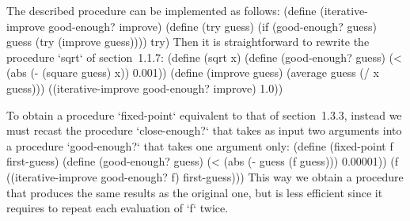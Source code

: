 The described procedure can be implemented as follows:
\begtt\scm
(define (iterative-improve good-enough? improve)
  (define (try guess)
    (if (good-enough? guess)
      guess
      (try (improve guess))))
  try)
\endtt
Then it is straightforward to rewrite the procedure `sqrt` of section~1.1.7:
\begtt\scm
(define (sqrt x)
  (define (good-enough? guess)
    (< (abs (- (square guess) x)) 0.001))
  (define (improve guess)
    (average guess (/ x guess)))
  ((iterative-improve good-enough? improve) 1.0))
\endtt

To obtain a procedure `fixed-point` equivalent to that of section~1.3.3, instead we must recast the procedure `close-enough?` that takes as input two arguments into a procedure `good-enough?` that takes one argument only:
\begtt\scm
(define (fixed-point f first-guess)
  (define (good-enough? guess)
    (< (abs (- guess (f guess))) 0.00001))
  (f ((iterative-improve good-enough? f) first-guess)))
\endtt
This way we obtain a procedure that produces the same results as the original one, but is less efficient since it requires to repeat each evaluation of `f` twice.
